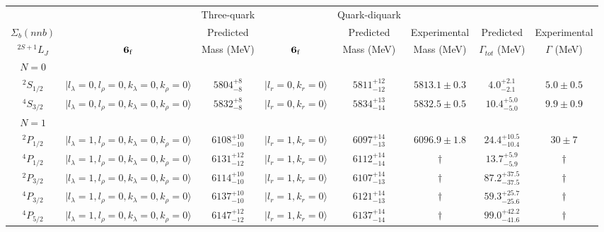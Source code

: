 \begin{tabular}{c| c c c c c c c}\hline \hline
        &    & Three-quark & & Quark-diquark    &               &              &  \\ 
$\Sigma_{b}(nnb)$ & & Predicted   &  &  Predicted   &  Experimental &  Predicted            & Experimental \\ 
 $^{2S+1}L_{J}$  &${\bf {6}}_{\rm f}$&  Mass (MeV)  & ${\bf {6}}_{\rm f}$&  Mass (MeV)   &  Mass (MeV)   &  $\Gamma_{tot}$ (MeV) & $\Gamma$ (MeV) \\ \hline
\hline
 $N=0$  &  &  &  &  &  \\ 
$^{2}S_{1/2}$ & $\vert l_{\lambda}\!\!=\!0, l_{\rho}\!\!=\!0, k_{\lambda}\!\!=\!0, k_{\rho}\!\!=\!0 \rangle$ & $5804^{+8}_{-8}$ & $\vert l_r\!\!=\!0, k_r\!\!=\!0 \rangle$ & $5811^{+12}_{-12}$ & $5813.1\pm 0.3$ & $4.0^{+2.1}_{-2.1}$ & $5.0\pm 0.5$ \\ 
$^{4}S_{3/2}$ & $\vert l_{\lambda}\!\!=\!0, l_{\rho}\!\!=\!0, k_{\lambda}\!\!=\!0, k_{\rho}\!\!=\!0 \rangle$ & $5832^{+8}_{-8}$ & $\vert l_r\!\!=\!0, k_r\!\!=\!0 \rangle$ & $5834^{+13}_{-14}$ & $5832.5\pm 0.5$ & $10.4^{+5.0}_{-5.0}$ & $9.9\pm 0.9$ \\ 
\hline
 $N=1$  &  &  &  &  &  \\ 
$^{2}P_{1/2}$ & $\vert l_{\lambda}\!\!=\!1, l_{\rho}\!\!=\!0, k_{\lambda}\!\!=\!0, k_{\rho}\!\!=\!0 \rangle$ & $6108^{+10}_{-10}$ & $\vert l_r\!\!=\!1, k_r\!\!=\!0 \rangle$ & $6097^{+14}_{-13}$ & $6096.9\pm 1.8$ & $24.4^{+10.5}_{-10.4}$ & $30\pm 7$ \\ 
$^{4}P_{1/2}$ & $\vert l_{\lambda}\!\!=\!1, l_{\rho}\!\!=\!0, k_{\lambda}\!\!=\!0, k_{\rho}\!\!=\!0 \rangle$ & $6131^{+12}_{-12}$ & $\vert l_r\!\!=\!1, k_r\!\!=\!0 \rangle$ & $6112^{+14}_{-14}$ & $\dagger$ & $13.7^{+5.9}_{-5.9}$ & $\dagger$ \\ 
$^{2}P_{3/2}$ & $\vert l_{\lambda}\!\!=\!1, l_{\rho}\!\!=\!0, k_{\lambda}\!\!=\!0, k_{\rho}\!\!=\!0 \rangle$ & $6114^{+10}_{-10}$ & $\vert l_r\!\!=\!1, k_r\!\!=\!0 \rangle$ & $6107^{+14}_{-13}$ & $\dagger$ & $87.2^{+37.5}_{-37.5}$ & $\dagger$ \\ 
$^{4}P_{3/2}$ & $\vert l_{\lambda}\!\!=\!1, l_{\rho}\!\!=\!0, k_{\lambda}\!\!=\!0, k_{\rho}\!\!=\!0 \rangle$ & $6137^{+10}_{-10}$ & $\vert l_r\!\!=\!1, k_r\!\!=\!0 \rangle$ & $6121^{+14}_{-13}$ & $\dagger$ & $59.3^{+25.7}_{-25.6}$ & $\dagger$ \\ 
$^{4}P_{5/2}$ & $\vert l_{\lambda}\!\!=\!1, l_{\rho}\!\!=\!0, k_{\lambda}\!\!=\!0, k_{\rho}\!\!=\!0 \rangle$ & $6147^{+12}_{-12}$ & $\vert l_r\!\!=\!1, k_r\!\!=\!0 \rangle$ & $6137^{+14}_{-14}$ & $\dagger$ & $99.0^{+42.2}_{-41.6}$ & $\dagger$ \\ 

\end{tabular}
